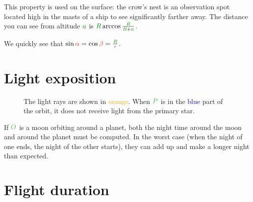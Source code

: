 \begin{remark}
This property is used on the surface: the crow's nest is an observation
spot located high in the masts of a ship to see significantly farther
away. The distance you can see from altitude $\dist{a}$ is $\dist{R}
\arccos \frac {\dist{R}} {\dist{R} + \dist{a}}$.
\end{remark}

We quickly see that $\sin \angle{\alpha} = \cos \angle{\beta} = \frac
{\dist{R}} {\dist{r}}$.



\section{Light exposition}

\begin{figure}[H]
	\centering
	\caption{
		The light rays are shown in \textcolor{orange}{orange}.
		When $\posit{P}$ is in the \textcolor{blue}{blue}
		part of the orbit, it does not receive light from the
		primary star.
	}
\end{figure}

\begin{important}
If $\posit{O}$ is a moon orbiting around a planet, both the night time
around the moon and around the planet must be computed. In the worst case
(when the night of one ends, the night of the other starts), they can
add up and make a longer night than expected.
\end{important}



\section{Flight duration}
